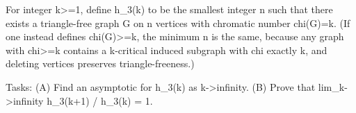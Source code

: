 For integer k>=1, define h_3(k) to be the smallest integer n such that there exists a triangle-free graph G on n vertices with chromatic number chi(G)=k.
(If one instead defines chi(G)>=k, the minimum n is the same, because any graph with chi>=k contains a k-critical induced subgraph with chi exactly k, and deleting vertices preserves triangle-freeness.)

Tasks:
(A) Find an asymptotic for h_3(k) as k->infinity.
(B) Prove that
  lim_{k->infinity} h_3(k+1) / h_3(k) = 1.

